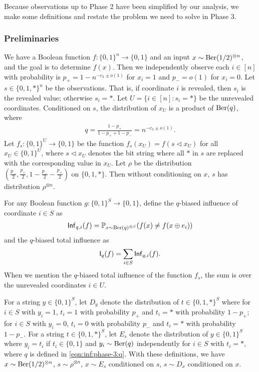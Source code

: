 Because observations up to Phase 2 have been simplified by our analysis, we make some definitions and restate the problem we need to solve in Phase 3.

\subsubsection{Preliminaries}
We have a Boolean function $f: \{0,1\}^n \to \{0,1\}$ and an input $x\sim \operatorname{\mathrm{Ber}}(1/2)^{\otimes n}$, and the goal is to determine $f(x)$.
Then we independently observe each $i\in [n]$ with probability is $p_+=1-n^{-c_3 \pm o(1)}$ for $x_i=1$ and $p_-=o(1)$ for $x_i=0$.
Let $s\in \{0,1,*\}^n$ be the observations. That is, if coordinate $i$ is revealed, then $s_i$ is the revealed value; otherwise $s_i=*$.
Let $U = \{i\in [n]: s_i=*\}$ be the unrevealed coordinates.
Conditioned on $s$, the distribution of $x_U$ is a product of $\operatorname{\mathrm{Ber}}(q)$, where
\begin{align} \label{eqn:inf:phase-3:q}
  q=\frac{1-p_+}{1-p_+ + 1-p_-} = n^{-c_3 \pm o(1)}.
\end{align}
Let $f_s: \{0,1\}^U\to \{0,1\}$ be the function $f_s(x_U) = f(s\lhd x_U)$ for all $x_U \in \{0,1\}^U$, where $s\lhd x_U$ denotes the bit string where all $*$ in $s$ are replaced with the corresponding value in $x_U$.
Let $\rho$ be the distribution $\left(\frac{p_-}2, \frac{p_+}2, 1-\frac{p_-}2-\frac{p_+}2\right)$ on $\{0,1,*\}$.
Then without conditioning on $x$, $s$ has distribution $\rho^{\otimes n}$.

For any Boolean function $g: \{0,1\}^S\to \{0,1\}$, define the $q$-biased influence of coordinate $i\in S$ as
\begin{align*}
  \operatorname{\mathsf{Inf}}_{q,i}(f) = \mathbb{P}_{x\sim \operatorname{\mathrm{Ber}}(q)^{\otimes S}}( f(x) \ne f(x\oplus e_i))
\end{align*}
and the $q$-biased total influence as
\begin{align*}
  \operatorname{\mathsf{I}}_q(f) = \sum_{i\in S} \operatorname{\mathsf{Inf}}_{q,i}(f).
\end{align*}
When we mention the $q$-biased total influence of the function $f_s$, the sum is over the unrevealed coordinates $i\in U$.

For a string $y\in \{0,1\}^S$, let $D_y$ denote the distribution of $t\in \{0,1,*\}^S$ where for $i\in S$ with $y_i=1$, $t_i=1$ with probability $p_+$ and $t_i=*$ with probability $1-p_+$; for $i\in S$ with $y_i=0$, $t_i=0$ with probability $p_-$ and $t_i=*$ with probability $1-p_-$.
For a string $t\in \{0,1,*\}^S$, let $E_s$ denote the distribution of $y\in \{0,1\}^S$ where $y_i=t_i$ if $t_i\in \{0,1\}$ and $y_i\sim \operatorname{\mathrm{Ber}}(q)$ independently for $i\in S$ with $t_i=*$, where $q$ is defined in \cref{eqn:inf:phase-3:q}.
With these definitions, we have $x\sim \operatorname{\mathrm{Ber}}(1/2)^{\otimes n}$, $s\sim \rho^{\otimes n}$, $x\sim E_s$ conditioned on $s$, $s\sim D_x$ conditioned on $x$.

